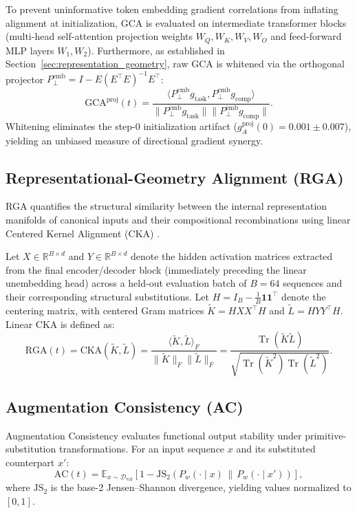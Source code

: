 \documentclass{article}
\theoremstyle{plain}
\theoremstyle{definition}
\DeclareMathOperator{\Tr}{Tr}
\begin{document}
To prevent uninformative token embedding gradient correlations from inflating alignment at initialization, GCA is evaluated on intermediate transformer blocks (multi-head self-attention projection weights $W_Q, W_K, W_V, W_O$ and feed-forward MLP layers $W_1, W_2$). Furthermore, as established in Section~\ref{sec:representation_geometry}, raw GCA is whitened via the orthogonal projector $P_{\perp}^{\text{emb}} = I - E (E^\top E)^{-1} E^\top$:
\begin{equation}
    \text{GCA}^{\text{proj}}(t) = \frac{\langle P_{\perp}^{\text{emb}} g_{\text{task}}, P_{\perp}^{\text{emb}} g_{\text{comp}} \rangle}{\| P_{\perp}^{\text{emb}} g_{\text{task}} \| \| P_{\perp}^{\text{emb}} g_{\text{comp}} \|}.
    \label{eq:app_whitened_gca}
\end{equation}
Whitening eliminates the step-0 initialization artifact ($g_A^{\text{proj}}(0) = 0.001 \pm 0.007$), yielding an unbiased measure of directional gradient synergy.

\subsection{Representational-Geometry Alignment (RGA)}
RGA quantifies the structural similarity between the internal representation manifolds of canonical inputs and their compositional recombinations using linear Centered Kernel Alignment (CKA) \citep{Kornblith2019Similarity}.

Let $X \in \mathbb{R}^{B \times d}$ and $Y \in \mathbb{R}^{B \times d}$ denote the hidden activation matrices extracted from the final encoder/decoder block (immediately preceding the linear unembedding head) across a held-out evaluation batch of $B=64$ sequences and their corresponding structural substitutions. Let $H = I_B - \frac{1}{B}\mathbf{1}\mathbf{1}^\top$ denote the centering matrix, with centered Gram matrices $\tilde{K} = H X X^\top H$ and $\tilde{L} = H Y Y^\top H$. Linear CKA is defined as:
\begin{equation}
    \text{RGA}(t) = \text{CKA}(\tilde{K}, \tilde{L}) = \frac{\langle \tilde{K}, \tilde{L} \rangle_F}{\| \tilde{K} \|_F \| \tilde{L} \|_F} = \frac{\Tr(\tilde{K} \tilde{L})}{\sqrt{\Tr(\tilde{K}^2) \Tr(\tilde{L}^2)}}.
    \label{eq:app_rga}
\end{equation}

\subsection{Augmentation Consistency (AC)}
Augmentation Consistency evaluates functional output stability under primitive-substitution transformations. For an input sequence $x$ and its substituted counterpart $x'$:
\begin{equation}
    \text{AC}(t) = \mathbb{E}_{x \sim \mathcal{D}_{\text{val}}} \left[ 1 - \text{JS}_2\left( P_w(\cdot \mid x) \,\|\, P_w(\cdot \mid x') \right) \right],
    \label{eq:app_ac}
\end{equation}
where $\text{JS}_2$ is the base-2 Jensen--Shannon divergence, yielding values normalized to $[0, 1]$.
\end{document}
